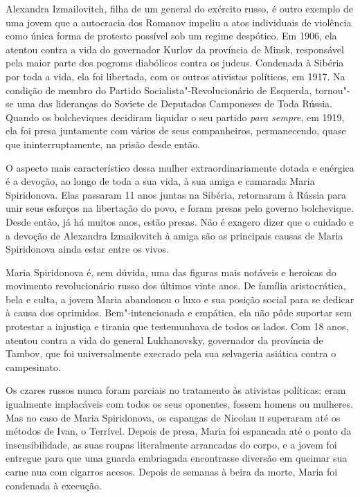 Alexandra Izmailovitch, filha de um general do exército russo, é outro
exemplo de uma jovem que a autocracia dos Romanov impeliu a atos
individuais de violência como única forma de protesto possível sob um
regime despótico. Em 1906, ela atentou contra a vida do governador
Kurlov da província de Minsk, responsável pela maior parte dos pogroms
diabólicos contra os judeus. Condenada à Sibéria por toda a vida, ela
foi libertada, com os outros ativistas políticos, em 1917. Na condição de
membro do Partido Socialista"-Revolucionário de Esquerda, tornou"-se uma
das lideranças do Soviete de Deputados Camponeses de Toda Rússia.
Quando os bolcheviques decidiram liquidar o seu partido \textit{para
sempre}, em 1919, ela foi presa juntamente com vários de seus
companheiros, permanecendo, quase que ininterruptamente, na prisão desde
então.

O aspecto mais característico dessa mulher extraordinariamente dotada e
enérgica é a devoção, ao longo de toda a sua vida, à sua amiga e
camarada Maria Spiridonova. Elas passaram 11 anos juntas na Sibéria,
retornaram à Rússia para unir seus esforços na libertação do povo, e
foram presas pelo governo bolchevique. Desde então, já há muitos anos,
estão presas. Não é exagero dizer que o cuidado e a devoção de Alexandra
Izmailovitch à amiga são as principais causas de Maria Spiridonova ainda
estar entre os vivos.

Maria Spiridonova é, sem dúvida, uma das figuras mais notáveis ​​e
heroicas do movimento revolucionário russo dos últimos vinte anos. De
família aristocrática, bela e culta, a jovem Maria abandonou o luxo e
sua posição social para se dedicar à causa dos oprimidos.
Bem"-intencionada e empática, ela não pôde suportar sem protestar a
injustiça e tirania que testemunhava de todos os lados. Com 18 anos,
atentou contra a vida do general Lukhanovsky, governador da província de
Tambov, que foi universalmente execrado pela sua selvageria asiática
contra o campesinato.

Os czares russos nunca foram parciais no tratamento às ativistas
políticas: eram igualmente implacáveis ​​com todos os seus oponentes,
fossem homens ou mulheres. Mas no caso de Maria Spiridonova, os capangas
de Nicolau \textsc{ii} superaram até os métodos de Ivan, o Terrível. Depois de
presa, Maria foi espancada até o ponto da insensibilidade, as suas roupas
literalmente arrancadas do corpo, e a jovem foi entregue para que uma guarda
embriagada encontrasse diversão em queimar sua carne nua com cigarros
acesos. Depois de semanas à beira da morte, Maria foi condenada à
execução.

